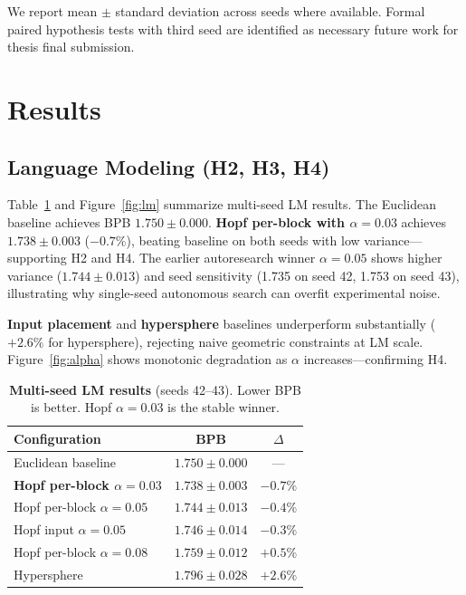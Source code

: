 \documentclass[11pt,twocolumn]{article}
\begin{document}
We report mean $\pm$ standard deviation across seeds where available. Formal paired hypothesis tests with third seed are identified as necessary future work for thesis final submission.

\section{Results}
\label{sec:results}

\subsection{Language Modeling (H2, H3, H4)}

Table~\ref{tab:lm} and Figure~\ref{fig:lm} summarize multi-seed LM results. The Euclidean baseline achieves BPB $1.750\pm0.000$. \textbf{Hopf per-block with $\alpha=0.03$} achieves $1.738\pm0.003$ ($-0.7\%$), beating baseline on both seeds with low variance---supporting H2 and H4. The earlier autoresearch winner $\alpha=0.05$ shows higher variance ($1.744\pm0.013$) and seed sensitivity (1.735 on seed 42, 1.753 on seed 43), illustrating why single-seed autonomous search can overfit experimental noise.

\textbf{Input placement} and \textbf{hypersphere} baselines underperform substantially ($+2.6\%$ for hypersphere), rejecting naive geometric constraints at LM scale. Figure~\ref{fig:alpha} shows monotonic degradation as $\alpha$ increases---confirming H4.

\begin{table}[t]
  \centering
  \caption{\textbf{Multi-seed LM results} (seeds 42--43). Lower BPB is better. Hopf $\alpha=0.03$ is the stable winner.}
  \label{tab:lm}
  \small
  \begin{tabular}{@{}lcc@{}}
    \toprule
    Configuration & BPB & $\Delta$ \\
    \midrule
    Euclidean baseline & $1.750 \pm 0.000$ & --- \\
    \textbf{Hopf per-block $\alpha{=}0.03$} & $\mathbf{1.738 \pm 0.003}$ & $\mathbf{-0.7\%}$ \\
    Hopf per-block $\alpha{=}0.05$ & $1.744 \pm 0.013$ & $-0.4\%$ \\
    Hopf input $\alpha{=}0.05$ & $1.746 \pm 0.014$ & $-0.3\%$ \\
    Hopf per-block $\alpha{=}0.08$ & $1.759 \pm 0.012$ & $+0.5\%$ \\
    Hypersphere & $1.796 \pm 0.028$ & $+2.6\%$ \\
    \bottomrule
  \end{tabular}
\end{table}
\end{document}
